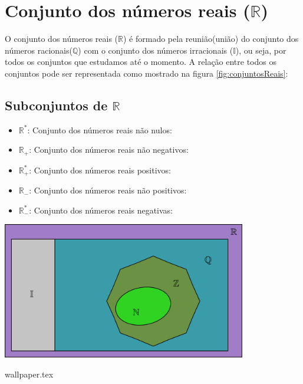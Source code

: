 \documentclass[10pt]{article}
\begin{document}
\section*{Conjunto dos números reais (\( \mathbb{R} \))}
O conjunto dos números reais (\( \mathbb{R} \)) é formado pela reunião(união) do conjunto dos números racionais(\( \mathbb{Q}\)) com o conjunto dos números irracionais (\( \mathbb{I}\)), ou seja, por todos os conjuntos que estudamos até o momento. A relação entre todos os conjuntos pode ser representada como mostrado na figura \ref{fig:conjuntosReais}:
\begin{multicols}{2}
\subsection*{Subconjuntos de \(\mathbb{R}\)}
\begin{itemize}
        \item \( \mathbb{R}^* \): Conjunto dos números reais não nulos:
        \item \( \mathbb{R}_+ \): Conjunto dos números reais não negativos:
        \item \( \mathbb{R}^*_+ \): Conjunto dos números reais positivos:
        \item  \( \mathbb{R}_- \): Conjunto dos números reais não positivos:
        \item  \( \mathbb{R}^*_- \): Conjunto dos números reais negativas:
    \end{itemize}
\columnbreak
\bigskip
\noindent
    \begin{minipage}{\linewidth}
        \centering 
        \includegraphics[width=0.8\textwidth]{imgs/conjuntosNumerico/conjuntosReais.pdf}
        \label{fig:conjuntosReais} 
    \end{minipage}%
\end{multicols} 
\newpage
{wallpaper.tex} %
\end{document}
